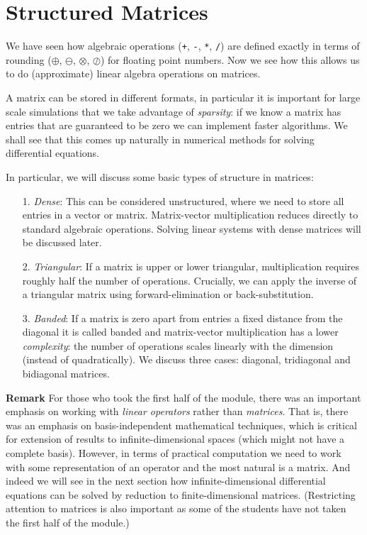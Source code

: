 
\section{Structured Matrices}
We have seen how algebraic operations (\texttt{+}, \texttt{-}, \texttt{*}, \texttt{/}) are defined exactly in terms of rounding ($\ensuremath{\oplus}$, $\ensuremath{\ominus}$, $\ensuremath{\otimes}$, $\ensuremath{\oslash}$) for floating point numbers. Now we see how this allows us to do (approximate) linear algebra operations on matrices.

A matrix can be stored in different formats, in particular it is important for large scale simulations that we take advantage of \emph{sparsity}: if we know a matrix has entries that are guaranteed to be zero we can implement faster algorithms. We shall see that this comes up naturally in numerical methods for solving differential equations.

In particular, we will discuss some basic types of structure in matrices:

\begin{itemize}
\item[1. ] \emph{Dense}: This can be considered unstructured, where we need to store all entries in a vector or matrix. Matrix-vector multiplication reduces directly to standard algebraic operations. Solving linear systems with dense matrices will be discussed later.


\item[2. ] \emph{Triangular}: If a matrix is upper or lower triangular, multiplication requires roughly half the number of operations. Crucially, we can apply the inverse of a triangular matrix using forward-elimination or back-substitution.


\item[3. ] \emph{Banded}: If a matrix is zero apart from entries a fixed distance from  the diagonal it is called banded and matrix-vector multiplication has a lower \emph{complexity}: the number of operations scales linearly with the dimension (instead of quadratically). We discuss three cases: diagonal, tridiagonal and bidiagonal matrices.

\end{itemize}
\textbf{Remark} For those who took the first half of the module, there was an important emphasis on working with \emph{linear operators} rather than \emph{matrices}. That is, there was an emphasis on basis-independent mathematical techniques, which is critical for extension of results to infinite-dimensional spaces (which might not have a complete basis). However, in terms of practical computation we need to work with some representation of an operator and the most natural is a matrix. And indeed we will see in the next section how infinite-dimensional differential equations can be solved by reduction to finite-dimensional matrices. (Restricting attention to matrices is also important as some of the students have not taken the first half of the module.)

